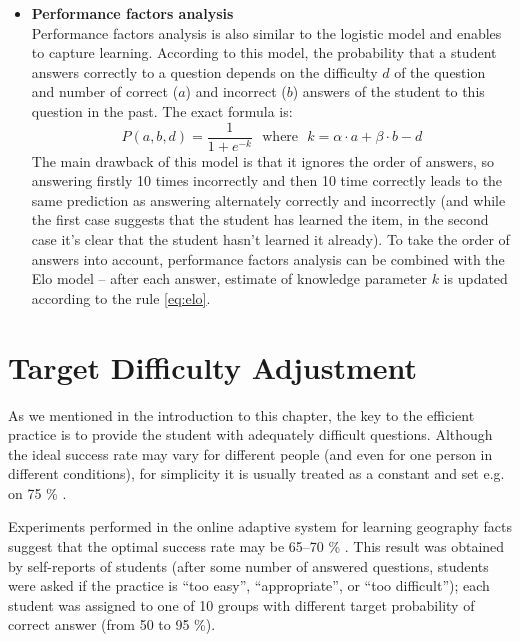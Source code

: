 \documentclass[12pt, twoside]{fithesis2}
\renewcommand{\_}{\leavevmode \kern0.07em\vbox{\hrule width0.4em}}
\newcommand{\squarebullet}{\textcolor{black}{\raisebox{0.15em}{\rule{4pt}{4pt}}}}
\newcommand{\emptysquarebullet}{\textcolor{black}{\raisebox{0.10em}{\tiny$\square$}}}
\newenvironment{myItemize}{
  \begin{itemize}[leftmargin=2em,rightmargin=1em,itemsep=\parskip ,parsep=0em,topsep=0em,partopsep=0em]
  \renewcommand{\labelitemi}{\squarebullet}
  \renewcommand{\labelitemii}{\textbullet}
}{
  \end{itemize}
}
\begin{document}
\begin{myItemize}
\item \textbf{Performance factors analysis}\\
  Performance factors analysis \cite{performance-factors-analysis} is also similar to the logistic model
  and enables to capture learning.
  According to this model, the probability that a student answers correctly to a question
  depends on the difficulty $d$ of the question and number of correct ($a$) and incorrect ($b$) answers of the student to this question in the past. The exact formula is:
  \begin{equation}\label{eq:pfa}
  P(a, b, d) = \frac{1}{1 + e^{-k}}
  \text{~~where~~} k = \alpha \cdot a + \beta \cdot b - d
  \end{equation}
  The main drawback of this model is that it ignores the order of answers,
  so answering firstly 10 times incorrectly and then 10 time correctly leads to the same prediction as answering alternately correctly and incorrectly (and while the first case suggests that the student has learned the item, in the second case it's clear that the student hasn't learned it already).
  To take the order of answers into account, performance factors analysis can be combined with the Elo model \cite{slepe-mapy} -- after each answer, estimate of knowledge parameter $k$ is updated according to the rule \ref{eq:elo}.
\end{myItemize}



\section{Target Difficulty Adjustment}
\label{sec:target-difficulty}

As we mentioned in the introduction to this chapter,
the key to the efficient practice is to provide the student with adequately difficult questions.
Although the ideal success rate may vary for different people (and even for one person in different conditions),
for simplicity it is usually treated as a constant and set e.g. on 75 \% \cite{slepe-mapy, adaptive-practice-irt-math}.

Experiments performed in the online adaptive system for learning geography facts suggest that the optimal success rate may be 65--70 \% \cite{slepe-mapy-motivation}.
This result was obtained by self-reports of students (after some number of answered questions, students were asked if the practice is ``too easy'', ``appropriate'', or ``too difficult'');
each student was assigned to one of 10 groups with different target probability of correct answer (from 50 to 95 \%).
\end{document}
